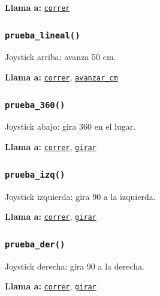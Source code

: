 \noindent\textbf{Llama a:} \hyperref[fn:calibrations:correr]{\texttt{correr}}\par

\subsubsection{\texttt{prueba\_\allowbreak{}lineal()}}\label{fn:calibrations:prueba-lineal}
\noindent Joystick arriba: avanza 50 cm.

\noindent\textbf{Llama a:} \hyperref[fn:calibrations:correr]{\texttt{correr}}, \hyperref[fn:calibrations:avanzar-cm]{\texttt{avanzar\_\allowbreak{}cm}}\par

\subsubsection{\texttt{prueba\_\allowbreak{}360()}}\label{fn:calibrations:prueba-360}
\noindent Joystick abajo: gira 360\textdegree{} en el lugar.

\noindent\textbf{Llama a:} \hyperref[fn:calibrations:correr]{\texttt{correr}}, \hyperref[fn:calibrations:girar]{\texttt{girar}}\par

\subsubsection{\texttt{prueba\_\allowbreak{}izq()}}\label{fn:calibrations:prueba-izq}
\noindent Joystick izquierda: gira 90\textdegree{} a la izquierda.

\noindent\textbf{Llama a:} \hyperref[fn:calibrations:correr]{\texttt{correr}}, \hyperref[fn:calibrations:girar]{\texttt{girar}}\par

\subsubsection{\texttt{prueba\_\allowbreak{}der()}}\label{fn:calibrations:prueba-der}
\noindent Joystick derecha: gira 90\textdegree{} a la derecha.

\noindent\textbf{Llama a:} \hyperref[fn:calibrations:correr]{\texttt{correr}}, \hyperref[fn:calibrations:girar]{\texttt{girar}}\par

